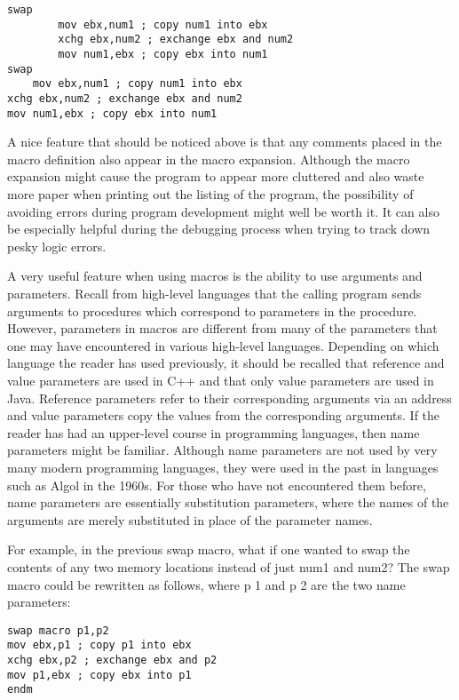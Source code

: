 \documentclass[10pt]{article}
\begin{document}
\begin{verbatim}
swap
        mov ebx,num1 ; copy num1 into ebx
        xchg ebx,num2 ; exchange ebx and num2
        mov num1,ebx ; copy ebx into num1
swap
    mov ebx,num1 ; copy num1 into ebx
xchg ebx,num2 ; exchange ebx and num2
mov num1,ebx ; copy ebx into num1
\end{verbatim}

A nice feature that should be noticed above is that any comments placed in the macro definition also appear in the macro expansion. Although the macro expansion might cause the program to appear more cluttered and also waste more paper when printing out the listing of the program, the possibility of avoiding errors during program development might well be worth it. It can also be especially helpful during the debugging process when trying to track down pesky logic errors.

A very useful feature when using macros is the ability to use arguments and parameters. Recall from high-level languages that the calling program sends arguments to procedures which correspond to parameters in the procedure. However, parameters in macros are different from many of the parameters that one may have encountered in various high-level languages. Depending on which language the reader has used previously, it should be recalled that reference and value parameters are used in C++ and that only value parameters are used in Java. Reference parameters refer to their corresponding arguments via an address and value parameters copy the values from the corresponding arguments. If the reader has had an upper-level course in programming languages, then name parameters might be familiar. Although name parameters are not used by very many modern programming languages, they were used in the past in languages such as Algol in the 1960s. For those who have not encountered them before, name parameters are essentially substitution parameters, where the names of the arguments are merely substituted in place of the parameter names.

For example, in the previous swap macro, what if one wanted to swap the contents of any two memory locations instead of just num1 and num2? The swap macro could be rewritten as follows, where p 1 and p 2 are the two name parameters:

\begin{verbatim}
swap macro p1,p2
mov ebx,p1 ; copy p1 into ebx
xchg ebx,p2 ; exchange ebx and p2
mov p1,ebx ; copy ebx into p1
endm
\end{verbatim}
\end{document}
